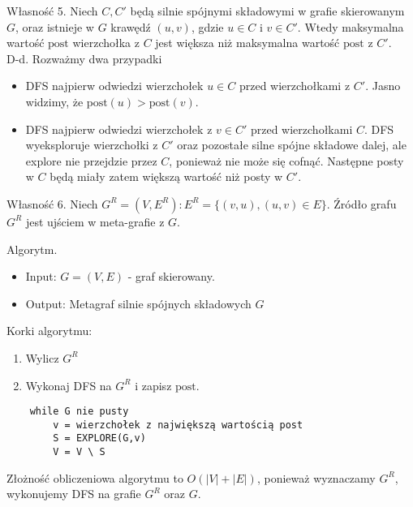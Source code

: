 \documentclass{article}
\numberwithin{equation}{subsection}
\begin{document}
\noindent
Własność 5. Niech $C, C'$ będą silnie spójnymi składowymi w grafie skierowanym $G$,
oraz istnieje w $G$ krawędź $(u,v)$, gdzie $u\in C$ i $v\in C'$. Wtedy maksymalna wartość $\text{post}$ wierzchołka z $C$ jest większa niż maksymalna wartość $\text{post}$ z $C'$.\\
D-d. Rozważmy dwa przypadki
\begin{itemize}
    \item DFS najpierw odwiedzi wierzchołek $u\in C$ przed wierzchołkami z $C'$. Jasno widzimy, że $\text{post}(u) > \text{post}(v)$.
    \item DFS najpierw odwiedzi wierzchołek z $v\in C'$ przed wierzchołkami $C$. DFS wyeksploruje wierzchołki z $C'$ oraz pozostałe silne spójne składowe dalej,
     ale explore nie przejdzie przez $C$, ponieważ nie może się cofnąć. Następne posty w $C$ będą miały zatem większą wartość niż posty w $C'$.
\end{itemize}

\noindent
Własność 6. Niech $G^R=(V,E^R) : E^R =\{(v,u), (u,v)\in E\}$. Źródło grafu $G^R$ jest ujściem w meta-grafie z $G$.

\noindent
Algorytm.
\begin{itemize}
    \item Input: $G=(V,E)$ - graf skierowany.
    \item Output: Metagraf silnie spójnych składowych $G$
\end{itemize}
Korki algorytmu:
\begin{enumerate}
    \item Wylicz $G^R$
    \item Wykonaj DFS na $G^R$ i zapisz $\text{post}$.
\end{enumerate}
\begin{verbatim}
    while G nie pusty
        v = wierzchołek z największą wartością post
        S = EXPLORE(G,v)
        V = V \ S
\end{verbatim}
Złożność obliczeniowa algorytmu to $O(|V|+|E|)$, ponieważ wyznaczamy $G^R$, wykonujemy DFS na grafie $G^R$ oraz $G$.
\end{document}
